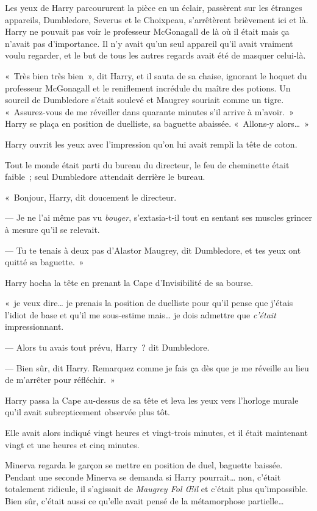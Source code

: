 Les yeux de Harry parcoururent la pièce en un éclair, passèrent sur les étranges appareils, Dumbledore, Severus et le Choixpeau, s'arrêtèrent brièvement ici et là. Harry ne pouvait pas voir le professeur McGonagall de là où il était mais ça n'avait pas d'importance. Il n'y avait qu'un seul appareil qu'il avait vraiment voulu regarder, et le but de tous les autres regards avait été de masquer celui-là.

«~Très bien très bien~», dit Harry, et il sauta de sa chaise, ignorant le hoquet du professeur McGonagall et le reniflement incrédule du maître des potions. Un sourcil de Dumbledore s'était soulevé et Maugrey souriait comme un tigre. «~Assurez-vous de me réveiller dans quarante minutes s'il arrive à m'avoir.~» Harry se plaça en position de duelliste, sa baguette abaissée. «~Allons-y alors…~»

\later

Harry ouvrit les yeux avec l'impression qu'on lui avait rempli la tête de coton.

Tout le monde était parti du bureau du directeur, le feu de cheminette était faible~; seul Dumbledore attendait derrière le bureau.

«~Bonjour, Harry, dit doucement le directeur.

--- Je ne l'ai même pas vu \emph{bouger}, s'extasia-t-il tout en sentant ses muscles grincer à mesure qu'il se relevait.

--- Tu te tenais à deux pas d'Alastor Maugrey, dit Dumbledore, et tes yeux ont quitté sa baguette.~»

Harry hocha la tête en prenant la Cape d'Invisibilité de sa bourse.

«~je veux dire… je prenais la position de duelliste pour qu'il pense que j'étais l'idiot de base et qu'il me sous-estime mais… je dois admettre que \emph{c'était} impressionnant.

--- Alors tu avais tout prévu, Harry~? dit Dumbledore.

--- Bien sûr, dit Harry. Remarquez comme je fais ça dès que je me réveille au lieu de m'arrêter pour réfléchir.~»

Harry passa la Cape au-dessus de sa tête et leva les yeux vers l'horloge murale qu'il avait subrepticement observée plus tôt.

Elle avait alors indiqué vingt heures et vingt-trois minutes, et il était maintenant vingt et une heures et cinq minutes.

\later

Minerva regarda le garçon se mettre en position de duel, baguette baissée. Pendant une seconde Minerva se demanda si Harry pourrait… non, c'était totalement ridicule, il s'agissait de \emph{Maugrey Fol Œil} et c'était plus qu'impossible. Bien sûr, c'était aussi ce qu'elle avait pensé de la métamorphose partielle…


